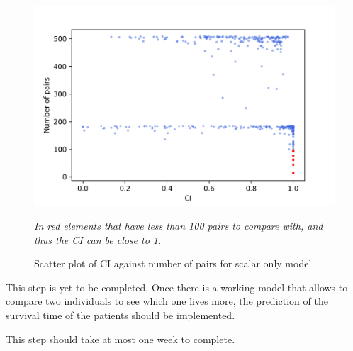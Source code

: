 \begin{figure}
  \centering
  \includegraphics[width=.8\textwidth]{images/results/scatter_scalar}
  \caption{Scatter plot of \acrshort{CI} against number of pairs for scalar only model
  \label{fig:scatter-scalar-CI}
  }

  \itshape\justify
  In red elements that have less than 100 pairs to compare with, and thus the \acrshort{CI} 
  can be close to 1.
\end{figure}


This step is yet to be completed. Once there is a working model that allows to compare two 
individuals to see which one lives more, the prediction of the survival time of the patients 
should be implemented.

This step should take at most one week to complete.

